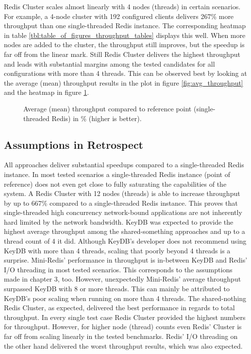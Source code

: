 Redis Cluster scales almost linearly with 4 nodes (threads) in certain scenarios. For example, a 4-node cluster with 192 configured clients delivers 267\% more throughput than one single-threaded Redis instance. The corresponding heatmap in table \ref{tbl:table_of_figures_throughput_tables} displays this well. When more nodes are added to the cluster, the throughput still improves, but the speedup is far off from the linear mark. Still Redis Cluster delivers the highest throughput and leads with substantial margins among the tested candidates for all configurations with more than 4 threads. This can be observed best by looking at the average (mean) throughput results in the plot in figure \ref{fig:avg_throughput} and the heatmap in figure \ref{fig:avg_throughput_heat}. 
\begin{figure}
    \centering
    \scalebox{0.6}{}
    \caption{Average (mean) throughput compared to reference point (single-threaded Redis) in \% (higher is better).}
    \label{fig:avg_throughput_heat}
\end{figure}

\subsection{Assumptions in Retrospect}
All approaches deliver substantial speedups compared to a single-threaded Redis instance. In most tested scenarios a single-threaded Redis instance (point of reference) does not even get close to fully saturating the capabilities of the system. A Redis Cluster with 12 nodes (threads) is able to increase throughput by up to 667\% compared to a single-threaded Redis instance. This proves that single-threaded high concurrency network-bound applications are not inherently hard limited by the network bandwidth.\newline
KeyDB was expected to provide the highest average throughput among the shared-something approaches and up to a thread count of 4 it did. Although KeyDB’s developer does not recommend using KeyDB with more than 4 threads, scaling that poorly beyond 4 threads is a surprise. \newline
Mini-Redis’ performance in throughput is in-between KeyDB and Redis’ I/O threading in most tested scenarios. This corresponds to the assumptions made in chapter 3, too. However, unexpectedly Mini-Redis’ average throughput surpassed KeyDB with 8 or more threads. This can mainly be attributed to KeyDB’s poor scaling when running on more than 4 threads. \newline
The shared-nothing Redis Cluster, as expected, delivered the best performance in regards to total throughput. In every single test case Redis Cluster provided the highest numbers for throughput. However, for higher node (thread) counts even Redis’ Cluster is far off from scaling linearly in the tested benchmarks. \newline
Redis’ I/O threading on the other hand delivered the worst throughput results, which was also expected.

